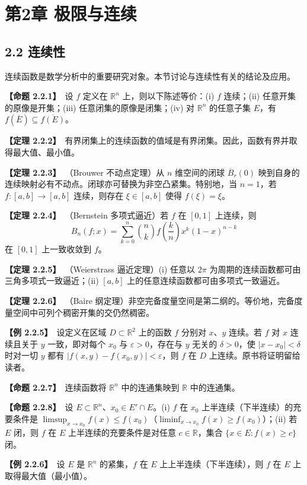 \documentclass[UTF8,a4paper,11pt]{ctexart}
\newcommand{\ex}[1]{\par\medskip\noindent\textbf{【例 #1】}\ }
\newcommand{\prop}[1]{\par\medskip\noindent\textbf{【命题 #1】}\ }
\newcommand{\thm}[1]{\par\medskip\noindent\textbf{【定理 #1】}\ }
\begin{document}
\section*{第2章 极限与连续}
\subsection*{2.2 连续性}
连续函数是数学分析中的重要研究对象。本节讨论与连续性有关的结论及应用。

\prop{2.2.1}设 $f$ 定义在 $\mathbb R^n$ 上，则以下陈述等价：(i) $f$ 连续；(ii) 任意开集的原像是开集；(iii) 任意闭集的原像是闭集；(iv) 对 $\mathbb R^n$ 的任意子集 $E$，有 $f(\overline E)\subseteq\overline{f(E)}$。

\thm{2.2.2}有界闭集上的连续函数的值域是有界闭集。因此，函数有界并取得最大值、最小值。

\thm{2.2.3}（Brouwer 不动点定理）从 $n$ 维空间的闭球 $\overline B_r(0)$ 映到自身的连续映射必有不动点。闭球亦可替换为非空凸紧集。特别地，当 $n=1$，若 $f:[a,b]\to[a,b]$ 连续，则存在 $\xi\in[a,b]$ 使得 $f(\xi)=\xi$。

\thm{2.2.4}（Bernstein 多项式逼近）若 $f$ 在 $[0,1]$ 上连续，则
\[
B_n(f;x)=\sum_{k=0}^{n}\binom nk f\!\left(\frac kn\right)x^k(1-x)^{n-k}
\]
在 $[0,1]$ 上一致收敛到 $f$。

\thm{2.2.5}（Weierstrass 逼近定理）(i) 任意以 $2\pi$ 为周期的连续函数都可由三角多项式一致逼近；(ii) $[a,b]$ 上的任意连续函数都可由多项式一致逼近。

\thm{2.2.6}（Baire 纲定理）非空完备度量空间是第二纲的。等价地，完备度量空间中可列个稠密开集的交仍然稠密。



\ex{2.2.5}设定义在区域 $D\subset\mathbb R^2$ 上的函数 $f$ 分别对 $x$、$y$ 连续。若 $f$ 对 $x$ 连续且关于 $y$ 一致，即对每个 $x_0$ 与 $\varepsilon>0$，存在与 $y$ 无关的 $\delta>0$，使 $|x-x_0|<\delta$ 时对一切 $y$ 都有 $|f(x,y)-f(x_0,y)|<\varepsilon$，则 $f$ 在 $D$ 上连续。原书将证明留给读者。

\prop{2.2.7}连续函数将 $\mathbb R^n$ 中的连通集映到 $\mathbb R$ 中的连通集。

\prop{2.2.8}设 $E\subset\mathbb R^n$、$x_0\in E'\cap E$。(i) $f$ 在 $x_0$ 上半连续（下半连续）的充要条件是 $\limsup_{x\to x_0}f(x)\le f(x_0)$（$\liminf_{x\to x_0}f(x)\ge f(x_0)$）；(ii) 若 $E$ 闭，则 $f$ 在 $E$ 上半连续的充要条件是对任意 $c\in\mathbb R$，集合 $\{x\in E:f(x)\ge c\}$ 闭。

\ex{2.2.6}设 $E$ 是 $\mathbb R^n$ 的紧集，$f$ 在 $E$ 上上半连续（下半连续），则 $f$ 在 $E$ 上取得最大值（最小值）。
\end{document}
